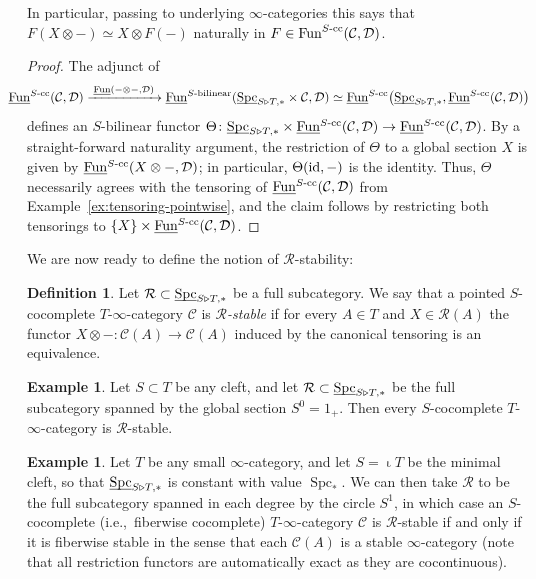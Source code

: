 \documentclass[reqno]{memo-l}
\theoremstyle{mythm}
\theoremstyle{definition}
\newtheorem{ex}[thm]{Example}
\newtheorem{definition}[thm]{Definition}
\numberwithin{equation}{section}
\newcommand{\Cc}{{\mathcal{C}}}
\newcommand{\Dd}{{\mathcal{D}}}
\newcommand{\Rr}{{\mathcal R}}
\DeclareMathOperator{\Spc}{Spc}
\newcommand{\Fun}{{\textup{Fun}}}
\DeclareMathOperator{\core}{\iota}
\newcommand{\id}{\textup{id}}
\newcommand{\ulhelper}[2]{\underline{\setbox0=\hbox{$#1#2$}\dp0=0.4pt \box0\relax}}
\newcommand{\ul}[1]{{\mathpalette\ulhelper{#1}}\hbox{\rule[-2pt]{0pt}{0pt}}}
\begin{document}
In particular, passing to underlying $\infty$-categories this says that $F(X\otimes-)\simeq X\otimes F(-)$ naturally in $F\in\Fun^\text{$S$-cc}(\Cc,\Dd)$. 

\begin{proof}
    The adjunct of
    \[\hskip-15.16pt\hfuzz=15.17pt
        \ul\Fun^\text{$S$-cc}(\Cc,\Dd)\xrightarrow{\;\ul\Fun(-\otimes-,\Dd)\;}
        \ul\Fun^\text{$S$-bilinear}(\ul\Spc_{S\triangleright T,*}\times\Cc,\Dd)\simeq
        \ul\Fun^\text{$S$-cc}\big(\ul\Spc_{S\triangleright T,*},\ul\Fun^\text{$S$-cc}(\Cc,\Dd)\big)
    \]
    defines an $S$-bilinear functor $\Theta\colon\ul\Spc_{S\triangleright T,*}\times\ul\Fun^\text{$S$-cc}(\Cc,\Dd)\to \ul\Fun^{\text{$S$-cc}}(\Cc,\Dd)$. By a straight-forward naturality argument, the restriction of $\Theta$ to a global section $X$ is given by $\ul\Fun^\text{$S$-cc}(X\otimes-,\Dd)$; in particular, $\Theta(\id,-)$ is the identity. Thus, $\Theta$ necessarily agrees with the tensoring of $\ul\Fun^\text{$S$-cc}(\Cc,\Dd)$ from Example~\ref{ex:tensoring-pointwise}, and the claim follows by restricting both tensorings to $\{X\}\times\ul\Fun^\text{$S$-cc}(\Cc,\Dd)$.
\end{proof}

We are now ready to define the notion of $\Rr$-stability:

\begin{definition}
    Let $\Rr\subset\ul\Spc_{S\triangleright T,*}$ be a full subcategory. We say that a pointed $S$-cocomplete $T$-$\infty$-category $\Cc$ is \emph{$\Rr$-stable} if for every $A\in T$ and $X\in\Rr(A)$ the functor $X\otimes{-}\colon\Cc(A)\to\Cc(A)$ induced by the canonical tensoring is an equivalence.
\end{definition}

\begin{ex}
    Let $S\subset T$ be any cleft, and let $\Rr\subset\ul\Spc_{S\triangleright T,*}$ be the full subcategory spanned by the global section $S^0=1_+$. Then every $S$-cocomplete $T$-$\infty$-category is $\Rr$-stable.
\end{ex}

\begin{ex}
    Let $T$ be any small $\infty$-category, and let $S=\core T$ be the minimal cleft, so that $\ul\Spc_{S\triangleright T,*}$ is constant with value $\Spc_*$. We can then take $\Rr$ to be the full subcategory spanned in each degree by the circle $S^1$, in which case an $S$-cocomplete (i.e.,\ fiberwise cocomplete) $T$-$\infty$-category $\Cc$ is $\Rr$-stable if and only if it is fiberwise stable in the sense that each $\Cc(A)$ is a stable $\infty$-category (note that all restriction functors are automatically exact as they are cocontinuous).
\end{ex}
\end{document}
